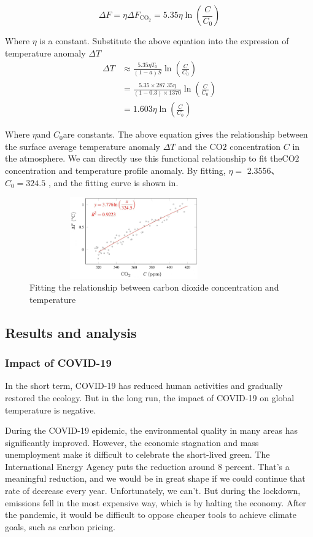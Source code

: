 \documentclass{apmcmthesis}
\begin{document}
$$
\Delta F=\eta \Delta F_{\mathrm{CO}_2}=5.35 \eta \ln \left(\frac{C}{C_0}\right)
$$

Where  $\eta$ is a constant. Substitute the above equation into the expression of temperature anomaly $\Delta T$ 
$$
\begin{aligned}
\Delta T & \approx \frac{5.35 \eta T_0}{(1-a) S} \ln \left(\frac{C}{C_0}\right) \\
&=\frac{5.35 \times 287.35 \eta}{(1-0.3) \times 1370} \ln \left(\frac{C}{C_0}\right) \\
&=1.603 \eta \ln \left(\frac{C}{C_0}\right)
\end{aligned}
$$

Where  $\eta$and  $C_0$are constants. The above equation gives the relationship between the surface average temperature anomaly $\Delta T$ and the $\mathrm{CO} 2$ concentration $C$ in the atmosphere. We can directly use this functional relationship to fit the$\mathrm{CO} 2$concentration and temperature profile anomaly. By fitting, $\eta=$ 2.3556、 $C_0=324.5$ , and the fitting curve is shown in\cite{co2}.

 \begin{figure} 
    \centering
    \includegraphics[width=9cm,height=3.5cm]{APMCMThesis/figures/co2.png}
    \caption{Fitting the relationship between carbon dioxide concentration and temperature}
\label{co2}
\end{figure}




\subsection{Results and analysis}
\subsubsection{Impact of COVID-19}
In the short term, COVID-19 has reduced human activities and gradually restored the ecology. But in the long run, the impact of COVID-19 on global temperature is negative.

During the COVID-19 epidemic, the environmental quality in many areas has significantly improved. However, the economic stagnation and mass unemployment make it difficult to celebrate the short-lived green. The International Energy Agency puts the reduction around 8 percent. That’s a meaningful reduction, and we would be in great shape if we could continue that rate of decrease every year. Unfortunately, we can’t.
But during the lockdown, emissions fell in the most expensive way, which is by halting the economy. After the pandemic, it would be difficult to oppose cheaper tools to achieve climate goals, such as carbon pricing. 
\end{document}
